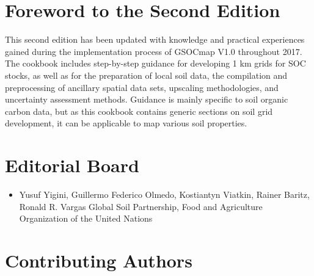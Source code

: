 \documentclass[10pt,b5paper,]{book}
\providecommand{\tightlist}{%
  \setlength{\itemsep}{0pt}\setlength{\parskip}{0pt}}
\theoremstyle{definition}
\theoremstyle{definition}
\theoremstyle{definition}
\theoremstyle{remark}
\begin{document}
\hypertarget{foreword-to-the-second-edition}{%
\section*{Foreword to the Second
Edition}\label{foreword-to-the-second-edition}}

This second edition has been updated with knowledge and practical
experiences gained during the implementation process of GSOCmap V1.0
throughout 2017. The cookbook includes step-by-step guidance for
developing 1 km grids for SOC stocks, as well as for the preparation of
local soil data, the compilation and preprocessing of ancillary spatial
data sets, upscaling methodologies, and uncertainty assessment methods.
Guidance is mainly specific to soil organic carbon data, but as this
cookbook contains generic sections on soil grid development, it can be
applicable to map various soil properties.

\clearpage

\hypertarget{editorial-board}{%
\section*{Editorial Board}\label{editorial-board}}

\begin{itemize}
\tightlist
\item
  Yusuf Yigini, Guillermo Federico Olmedo, Kostiantyn Viatkin, Rainer
  Baritz, Ronald R. Vargas Global Soil Partnership, Food and Agriculture
  Organization of the United Nations
\end{itemize}

\hypertarget{contributing-authors}{%
\section*{Contributing Authors}\label{contributing-authors}}
\end{document}
